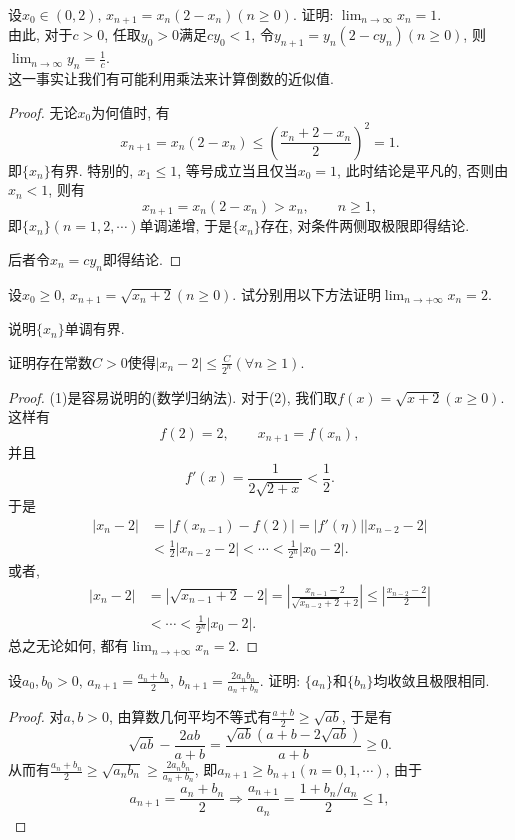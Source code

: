 \begin{quiza}
\woe 设\(x_0\in(0,2),\,x_{n+1}=x_n(2-x_n)(n\geqslant 0)\). 证明: \(\lim_{n\rightarrow\infty}x_n=1\).\\ 由此, 对于\(c>0\), 任取\(y_0>0\)满足\(cy_0<1\), 令\(y_{n+1}=y_{n}(2-cy_n)(n\geqslant 0)\), 则\(\lim_{n\rightarrow\infty}y_n=\frac{1}{c}\).\\这一事实让我们有可能利用乘法来计算倒数的近似值.
\begin{proof}
无论\(x_0\)为何值时, 有\[x_{n+1}=x_n(2-x_n)\leqslant\left(\frac{x_n+2-x_n}{2}\right)^2=1.\]即\(\{x_n\}\)有界. 特别的, \(x_1\leqslant 1\), 等号成立当且仅当\(x_0=1\), 此时结论是平凡的, 否则由\(x_n<1\), 则有\[x_{n+1}=x_n(2-x_n)>x_n,\qquad n\geqslant 1,\]即\(\{x_n\}(n=1,2,\cdots)\)单调递增, 于是\(\{x_n\}\)存在, 对条件两侧取极限即得结论.

后者令\(x_n=cy_n\)即得结论.
\end{proof}
\woe 设\(x_0\geqslant 0\), \(x_{n+1}=\sqrt{x_n+2}(n\geqslant 0)\). 试分别用以下方法证明\(\lim_{n\rightarrow+\infty}x_n=2\).
\begin{quizcs}
\item 说明\(\{x_n\}\)单调有界.
\item 证明存在常数\(C>0\)使得\(|x_n-2|\leqslant\frac{C}{2^n}(\forall n\geqslant 1)\).      
\end{quizcs}
\begin{proof}
    (1)是容易说明的(数学归纳法). 对于(2), 我们取\(f(x)=\sqrt{x+2}(x\geqslant 0)\). 这样有\[f(2)=2,\qquad x_{n+1}=f(x_n),\]并且\[f'(x)=\frac{1}{2\sqrt{2+x}}<\frac{1}{2}.\]于是\[\begin{split}
      |x_n-2|&=\left|f(x_{n-1})-f(2)\right|=\left|f'(\eta)\right||x_{n-2}-2|\\&<\frac{1}{2}|x_{n-2}-2|<\cdots <\frac{1}{2^n}|x_0-2|.
    \end{split}\]
    或者,\[\begin{split}
      |x_n-2|&=|\sqrt{x_{n-1}+2}-2|=\left|\frac{x_{n-1}-2}{\sqrt{x_{n-2}+2}+2}\right|\leqslant \left|\frac{x_{n-2}-2}{2}\right|\\ &<\cdots<\frac{1}{2^n}|x_0-2|.
    \end{split}\]总之无论如何, 都有\(\lim_{n\rightarrow+\infty}x_n=2\).
\end{proof}
\woe 设\(a_0,b_0>0\), \( a_{n+1}=\frac{a_n+b_n}{2},\,b_{n+1}=\frac{2a_nb_n}{a_n+b_n}\). 证明: \(\{a_n\}\)和\(\{b_n\}\)均收敛且极限相同.
\begin{proof}
对\(a, b>0\), 由算数几何平均不等式有\(\frac{a+b}{2}\geqslant\sqrt{ab}\), 于是有\[\sqrt{ab}-\frac{2ab}{a+b}=\frac{\sqrt{ab}\left(a+b-2\sqrt{ab}\right)}{a+b}\geqslant 0.\]从而有\(\frac{a_n+b_n}{2}\geqslant \sqrt{a_nb_n}\geqslant\frac{2a_nb_n}{a_n+b_n}\), 即\(a_{n+1}\geqslant b_{n+1}(n=0,1,\cdots)\), 由于\[a_{n+1}=\frac{a_n+b_n}{2}\Rightarrow\frac{a_{n+1}}{a_n}=\frac{1+b_n/a_n}{2}\leqslant 1,\]

\end{proof}
\end{quiza}
